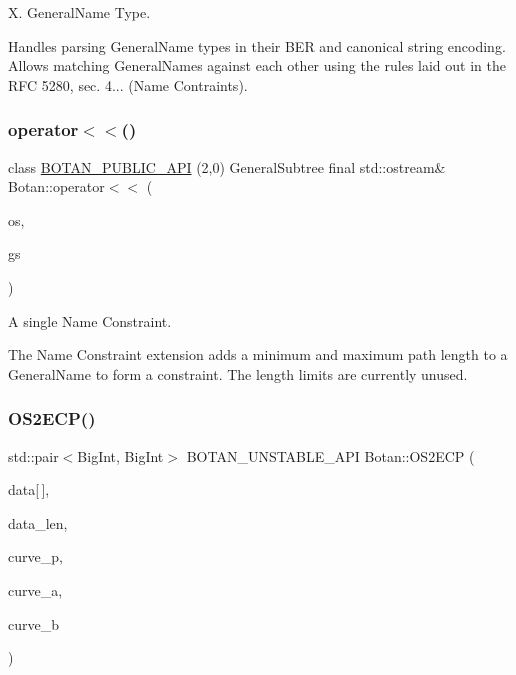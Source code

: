 X. General\+Name Type. 

Handles parsing General\+Name types in their B\+ER and canonical string encoding. Allows matching General\+Names against each other using the rules laid out in the R\+FC 5280, sec. 4... (Name Contraints). \mbox{\label{namespace_botan_a4a574838c76faf9906e9c8bf369f52f6}} 
\subsubsection{\texorpdfstring{operator$<$$<$()}{operator<<()}\hspace{0.1cm}{\footnotesize\ttfamily [2/2]}}
{\footnotesize\ttfamily class \hyperlink{namespace_botan_a6b9388030d872e586a4655b776ac9501}{B\+O\+T\+A\+N\+\_\+\+P\+U\+B\+L\+I\+C\+\_\+\+A\+PI} (2,0) General\+Subtree final std\+::ostream\& Botan\+::operator$<$$<$ (\begin{DoxyParamCaption}\item[{std\+::ostream \&}]{os,  }\item[{const General\+Subtree \&}]{gs }\end{DoxyParamCaption})\hspace{0.3cm}{\ttfamily [final]}}



A single Name Constraint. 

The Name Constraint extension adds a minimum and maximum path length to a General\+Name to form a constraint. The length limits are currently unused. \mbox{\label{namespace_botan_a1176657848d01fc06ba2d1e2faf0669d}} 
\subsubsection{\texorpdfstring{O\+S2\+E\+C\+P()}{OS2ECP()}}
{\footnotesize\ttfamily std\+::pair$<$Big\+Int, Big\+Int$>$ B\+O\+T\+A\+N\+\_\+\+U\+N\+S\+T\+A\+B\+L\+E\+\_\+\+A\+PI Botan\+::\+O\+S2\+E\+CP (\begin{DoxyParamCaption}\item[{const uint8\+\_\+t}]{data\mbox{[}$\,$\mbox{]},  }\item[{size\+\_\+t}]{data\+\_\+len,  }\item[{const Big\+Int \&}]{curve\+\_\+p,  }\item[{const Big\+Int \&}]{curve\+\_\+a,  }\item[{const Big\+Int \&}]{curve\+\_\+b }\end{DoxyParamCaption})}

